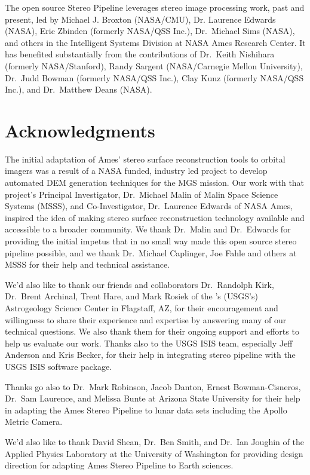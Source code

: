 The open source Stereo Pipeline leverages stereo image processing
work, past and present, led by Michael J. Broxton (NASA/CMU),
Dr. Laurence Edwards (NASA), Eric Zbinden (formerly NASA/QSS Inc.),
Dr.~Michael Sims (NASA), and others in the Intelligent Systems
Division at NASA Ames Research Center. It has benefited substantially
from the contributions of Dr.~Keith Nishihara (formerly
NASA/Stanford), Randy Sargent (NASA/Carnegie Mellon University),
Dr.~Judd Bowman (formerly NASA/QSS Inc.), Clay Kunz (formerly NASA/QSS
Inc.), and Dr.~Matthew Deans (NASA).

\section*{Acknowledgments}

The initial adaptation of Ames' stereo surface reconstruction tools to
orbital imagers was a result of a NASA funded, industry led project to
develop automated \ac{DEM} generation techniques for
the \ac{MGS} mission. Our work with that project's
Principal Investigator, Dr.~Michael Malin of Malin Space Science
Systems (MSSS), and Co-Investigator, Dr.~Laurence Edwards of NASA
Ames, inspired the idea of making stereo surface reconstruction
technology available and accessible to a broader community.  We thank
Dr.~Malin and Dr.~Edwards for providing the initial impetus that in no
small way made this open source stereo pipeline possible, and we thank
Dr.~Michael Caplinger, Joe Fahle and others at MSSS for their help and
technical assistance.

We'd also like to thank our friends and collaborators Dr.~Randolph
Kirk, Dr.~Brent Archinal, Trent Hare, and Mark Rosiek of the
's (\acs{USGS}'s) Astrogeology Science Center in Flagstaff,
AZ, for their encouragement and willingness to share their experience
and expertise by answering many of our technical questions.  We also
thank them for their ongoing support and efforts to help us evaluate
our work.  Thanks also to the \ac{USGS} \ac{ISIS} team, especially
Jeff Anderson and Kris Becker, for their help in integrating stereo
pipeline with the \ac{USGS} \ac{ISIS} software package.

Thanks go also to Dr.~Mark Robinson, Jacob Danton, Ernest
Bowman-Cisneros, Dr.~Sam Laurence, and Melissa Bunte at Arizona State
University for their help in adapting the Ames Stereo Pipeline to
lunar data sets including the Apollo Metric Camera.

We'd also like to thank David Shean, Dr.~Ben Smith, and Dr.~Ian
Joughin of the Applied Physics Laboratory at the University of
Washington for providing design direction for adapting Ames Stereo
Pipeline to Earth sciences.


